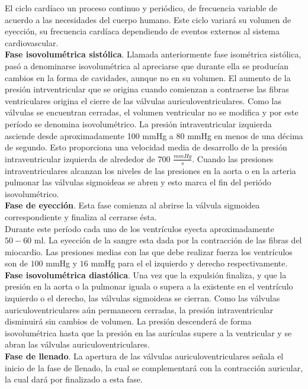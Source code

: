 El ciclo cardíaco un proceso continuo y periódico, de frecuencia variable de acuerdo a las necesidades del cuerpo
humano. Este ciclo variará su volumen de eyección, su frecuencia cardíaca dependiendo de eventos externos al sistema
cardiovascular. \\
\indent \textbf{Fase isovolumétrica sistólica}. Llamada anteriormente fase isométrica sistólica, pasó
a denominarse isovolumétrica al apreciarse que durante ella se producían cambios en la forma de cavidades, aunque no
en su volumen. El aumento de la presión intrventricular que se origina cuando comienzan a contraerse las fibras
ventriculares origina el cierre de las válvulas auriculoventriculares. Como las válvulas se encuentran cerradas, el
volumen ventricular no se modifica y por este período se denomina isovolumétrico. La presión intraventricular izquierda
asciende desde aproximadamente 100 mmHg a 80 mmHg en menos de una décima de segundo. Esto proporciona una velocidad
media de desarrollo de la presión intraventricular izquierda de alrededor de 700 $\frac{mmHg}{s}$. Cuando las
presiones intraventriculares alcanzan los niveles de las presiones en la aorta o en la arteria pulmonar las válvulas
sigmoideas se abren y esto marca el fin del periódo isovolumétrico. \\
\indent \textbf{Fase de eyección}. Esta fase comienza al abrirse la válvula sigmoidea correspondiente y finaliza al
cerrarse ésta. \\
\indent Durante este período cada uno de los ventrículos eyecta aproximadamente $50-60$ ml. La eyección de la sangre
esta dada por la contracción de las fibras del miocardio. Las presiones medias con las que debe realizar fuerza los
ventrículos son de $100$ mmHg y $16$ mmHg para el el izquierdo y derecho respectivamente. \\
\indent \textbf{Fase isovolumétrica diastólica}. Una vez que la expulsión finaliza, y que la presión en la aorta o
la pulmonar iguala o supera a la existente en el ventrículo izquierdo o el derecho, las válvulas sigmoideas se
cierran. Como las válvulas auriculoventriculares aún permanecen cerradas, la presión intraventricular disminuirá sin
cambios de volumen. La presión descenderá de forma isovolumétrica hasta que la presión en las aurículas supere a la
ventricular y se abran las válvulas auriculoventriculares. \\
\indent \textbf{Fase de llenado}. La apertura de las válvulas auriculoventriculares señala el inicio de la fase de
llenado, la cual se complementará con la contracción auricular, la cual dará por finalizado a esta fase.

